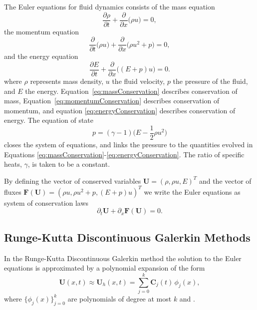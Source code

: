 \documentclass[10pt,preprint]{aastex}
\begin{document}
The Euler equations for fluid dynamics \citep[see, e.g.,][for details]{Leveque2002} consists of the mass equation
\begin{equation}
  \frac{\partial \rho}{\partial t}  
  + \frac{\partial}{\partial x} \Big(\rho u\Big) = 0,
  \label{eq:massConservation}
\end{equation}
the momentum equation
\begin{equation}
  \frac{\partial}{\partial t} \Big(\rho u\Big)
  + \frac{\partial}{\partial x} \Big(\rho u^2 + p\Big) = 0,
  \label{eq:momentumConservation}
\end{equation}
and the energy equation
\begin{equation}
  \frac{\partial E}{\partial t}
  + \frac{\partial}{\partial x} \Big((E + p) u\Big) = 0.  
  \label{eq:energyConservation}
\end{equation}
where $\rho$ represents mass density, $u$ the fluid velocity, $p$ the pressure of the fluid, and $E$ the energy.  
Equation~\eqref{eq:massConservation} describes conservation of mass, Equation~\eqref{eq:momentumConservation} describes conservation of momentum, and equation \eqref{eq:energyConservation} describes conservation of energy.
The equation of state
\begin{equation}
  p = (\gamma - 1)
  \Big(E - \frac{1}{2} \rho u^2 \Big)
  \label{eq:eos}
\end{equation}
closes the system of equations, and links the pressure to the quantities evolved in Equations \eqref{eq:massConservation}-\eqref{eq:energyConservation}. 
The ratio of specific heats, $\gamma$, is taken to be a constant.  

By defining the vector of conserved variables $\boldsymbol{U}=(\rho,\rho u,E)^{T}$ and the vector of fluxes $\boldsymbol{F}(\boldsymbol{U})=(\rho u,\rho u^{2}+p,(E+p)u)^{T}$ we write the Euler equations as system of conservation laws
\begin{equation}
  \partial_{t}\boldsymbol{U}
  +\partial_{x}\boldsymbol{F}(\boldsymbol{U})
  =0.
\end{equation}

\subsection{Runge-Kutta Discontinuous Galerkin Methods}

In the Runge-Kutta Discontinuous Galerkin \citep[RKDG;][]{cockburnShu_2001} method the solution to the Euler equations is approximated by a polynomial expansion of the form
\begin{equation}
  \boldsymbol{U}(x,t)
  \approx\boldsymbol{U}_{h}(x,t)=\sum_{j=0}^{k}\boldsymbol{C}_{j}(t)\,\phi_{j}(x),
\end{equation}
where $\{\phi_{j}(x)\}_{j=0}^{k}$ are polynomials of degree at most $k$ and .  
\end{document}
